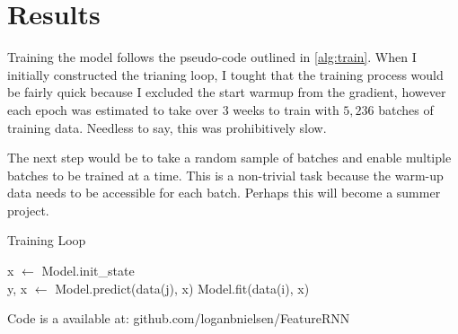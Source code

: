 \documentclass{article}
\numberwithin{equation}{subsection}
\begin{document}
\section{Results}

Training the model follows the pseudo-code outlined in \ref{alg:train}. When I initially constructed
the trianing loop, I tought that the training process would be fairly quick because I excluded the
start warmup from the gradient, however each epoch was estimated to take over 3 weeks to train with
$5,236$ batches of training data. Needless to say, this was prohibitively slow.

The next step would be to take a random sample of batches and enable multiple batches to be trained
at a time. This is a non-trivial task because the warm-up data needs to be accessible for each batch.
Perhaps this will become a summer project.

\begin{algorithm}
\caption{Training Loop} \label{alg:train}
\begin{algorithmic}
    \STATE x $\leftarrow$ Model.init\_state
    \\ 
      \STATE y, x $\leftarrow$ Model.predict(data(j), x)
    \ENDFOR
    \STATE Model.fit(data(i), x)
  \ENDFOR
\ENDFOR
\end{algorithmic}
\end{algorithm}

Code is a available at: github.com/loganbnielsen/FeatureRNN




\ \\\ \\\  \\\  \\\  \\\  \\\  



\end{document}

